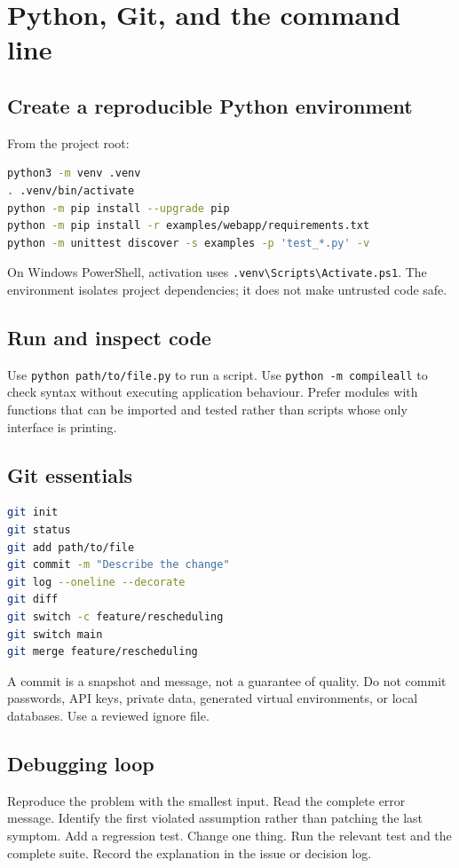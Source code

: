 \chapter{Python, Git, and the command line}
\label{app:tools}

\section{Create a reproducible Python environment}
From the project root:
\begin{lstlisting}[language=bash]
python3 -m venv .venv
. .venv/bin/activate
python -m pip install --upgrade pip
python -m pip install -r examples/webapp/requirements.txt
python -m unittest discover -s examples -p 'test_*.py' -v
\end{lstlisting}
On Windows PowerShell, activation uses \texttt{.venv\textbackslash Scripts\textbackslash Activate.ps1}. The environment isolates project dependencies; it does not make untrusted code safe.

\section{Run and inspect code}
Use \texttt{python path/to/file.py} to run a script. Use \texttt{python -m compileall} to check syntax without executing application behaviour. Prefer modules with functions that can be imported and tested rather than scripts whose only interface is printing.

\section{Git essentials}
\begin{lstlisting}[language=bash]
git init
git status
git add path/to/file
git commit -m "Describe the change"
git log --oneline --decorate
git diff
git switch -c feature/rescheduling
git switch main
git merge feature/rescheduling
\end{lstlisting}
A commit is a snapshot and message, not a guarantee of quality. Do not commit passwords, API keys, private data, generated virtual environments, or local databases. Use a reviewed ignore file.

\section{Debugging loop}
Reproduce the problem with the smallest input. Read the complete error message. Identify the first violated assumption rather than patching the last symptom. Add a regression test. Change one thing. Run the relevant test and the complete suite. Record the explanation in the issue or decision log.

